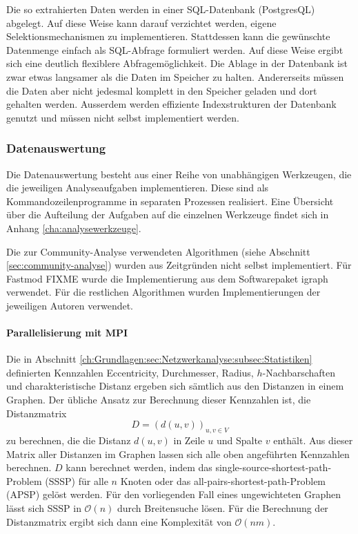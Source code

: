 Die so extrahierten Daten werden in einer SQL-Datenbank (PostgresQL)
abgelegt. Auf diese Weise kann darauf verzichtet werden, eigene
Selektionsmechanismen zu implementieren. Stattdessen kann die
gewünschte Datenmenge einfach als SQL-Abfrage formuliert werden. Auf
diese Weise ergibt sich eine deutlich flexiblere
Abfragemöglichkeit. Die Ablage in der Datenbank ist zwar etwas
langsamer als die Daten im Speicher zu halten. Andererseits müssen die
Daten aber nicht jedesmal komplett in den Speicher geladen und dort
gehalten werden. Ausserdem werden effiziente Indexstrukturen der
Datenbank genutzt und müssen nicht selbst implementiert werden.

\subsubsection{Datenauswertung}
\label{sec:datenauswertung}

Die Datenauswertung besteht aus einer Reihe von unabhängigen
Werkzeugen, die die jeweiligen Analyseaufgaben implementieren. Diese
sind als Kommandozeilenprogramme in separaten Prozessen
realisiert. Eine \"Ubersicht \"uber die Aufteilung der Aufgaben auf
die einzelnen Werkzeuge findet sich in Anhang
\ref{cha:analysewerkzeuge}.

Die zur Community-Analyse verwendeten Algorithmen (siehe Abschnitt
\ref{sec:community-analyse}) wurden aus Zeitgr\"unden nicht selbst
implementiert. F\"ur Fastmod FIXME wurde die Implementierung aus dem
Softwarepaket igraph\cite{Csardi2006} verwendet. F\"ur die restlichen
Algorithmen wurden Implementierungen der jeweiligen Autoren verwendet.

\paragraph{Parallelisierung mit MPI}
\label{sec:parall-mitt-mpi}

Die in Abschnitt
\ref{ch:Grundlagen:sec:Netzwerkanalyse:subsec:Statistiken} definierten
Kennzahlen Eccentricity, Durchmesser, Radius, $h$-Nachbarschaften und
charakteristische Distanz ergeben sich s\"amtlich aus den Distanzen in
einem Graphen. Der \"ubliche Ansatz zur Berechnung dieser Kennzahlen
ist, die Distanzmatrix
\begin{equation}
  \label{eq:7}
  D = (d(u, v))_{u, v\in V}
\end{equation}
zu berechnen, die die Distanz $d(u, v)$ in Zeile $u$ und Spalte $v$
enth\"alt\cite{Brinkmeier2004}. Aus dieser Matrix aller Distanzen im
Graphen lassen sich alle oben angef\"uhrten Kennzahlen berechnen. $D$
kann berechnet werden, indem das single-source-shortest-path-Problem
(SSSP) f\"ur alle $n$ Knoten oder das all-pairs-shortest-path-Problem
(APSP) gel\"ost werden. F\"ur den vorliegenden Fall eines
ungewichteten Graphen l\"asst sich SSSP in $\mathcal{O}(n)$ durch
Breitensuche l\"osen. F\"ur die Berechnung der Distanzmatrix ergibt
sich dann eine Komplexit\"at von $\mathcal{O}(nm)$.


